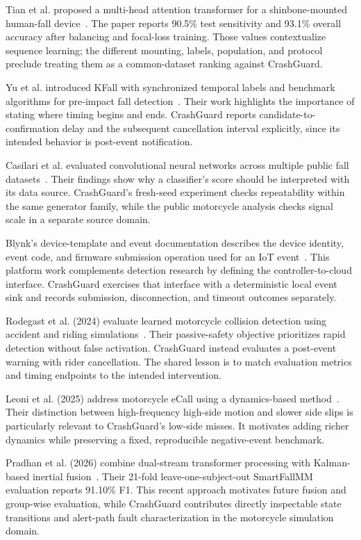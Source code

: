 \documentclass[10pt,a4paper]{article}
\begin{document}
Tian et al. proposed a multi-head attention transformer for a shinbone-mounted human-fall device~\cite{tian2026transformer}. The paper reports 90.5\% test sensitivity and 93.1\% overall accuracy after balancing and focal-loss training. Those values contextualize sequence learning; the different mounting, labels, population, and protocol preclude treating them as a common-dataset ranking against CrashGuard.

Yu et al. introduced KFall with synchronized temporal labels and benchmark algorithms for pre-impact fall detection~\cite{kfall}. Their work highlights the importance of stating where timing begins and ends. CrashGuard reports candidate-to-confirmation delay and the subsequent cancellation interval explicitly, since its intended behavior is post-event notification.

Casilari et al. evaluated convolutional neural networks across multiple public fall datasets~\cite{cnn}. Their findings show why a classifier's score should be interpreted with its data source. CrashGuard's fresh-seed experiment checks repeatability within the same generator family, while the public motorcycle analysis checks signal scale in a separate source domain.

Blynk's device-template and event documentation describes the device identity, event code, and firmware submission operation used for an IoT event~\cite{blynktemplate,blynkevents}. This platform work complements detection research by defining the controller-to-cloud interface. CrashGuard exercises that interface with a deterministic local event sink and records submission, disconnection, and timeout outcomes separately.

Rodegast et al. (2024) evaluate learned motorcycle collision detection using accident and riding simulations~\cite{rodegast2024}. Their passive-safety objective prioritizes rapid detection without false activation. CrashGuard instead evaluates a post-event warning with rider cancellation. The shared lesson is to match evaluation metrics and timing endpoints to the intended intervention.

Leoni et al. (2025) address motorcycle eCall using a dynamics-based method~\cite{ecall2025}. Their distinction between high-frequency high-side motion and slower side slips is particularly relevant to CrashGuard's low-side misses. It motivates adding richer dynamics while preserving a fixed, reproducible negative-event benchmark.

Pradhan et al. (2026) combine dual-stream transformer processing with Kalman-based inertial fusion~\cite{dual2026}. Their 21-fold leave-one-subject-out SmartFallMM evaluation reports 91.10\% F1. This recent approach motivates future fusion and group-wise evaluation, while CrashGuard contributes directly inspectable state transitions and alert-path fault characterization in the motorcycle simulation domain.
\end{document}
